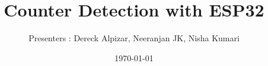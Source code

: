 \usepackage[utf8]{inputenc} %
\usepackage[german]{babel}
\usepackage{amsmath}
\usepackage{amsfonts}
\usepackage{amssymb}
\usepackage{colortbl}
\usepackage{cancel} %

\usepackage{pgfpages} 

\usepackage{tikz}
\usepackage{gnuplottex}
\usepackage{pgf}
\usepackage{colortbl} 
\usetikzlibrary{calc}
\usetikzlibrary{shapes,arrows} %
\usetikzlibrary{shapes.geometric} %
\usepackage{scalefnt}
\usetikzlibrary{decorations.markings} %
\usetikzlibrary{calc,patterns,decorations.pathmorphing,decorations.markings}
\title{Counter Detection with ESP32}
\author{Presenters : Dereck Alpizar, Neeranjan JK, Nisha Kumari}
\date{\today}
\usepackage{url}

